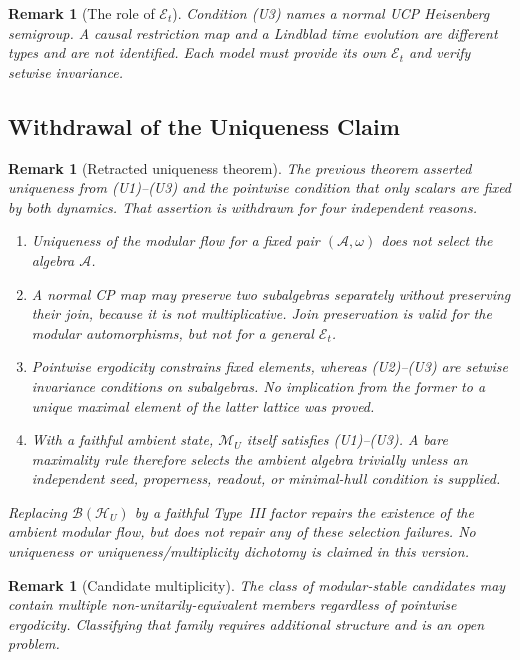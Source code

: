 \documentclass[12pt,a4paper,openany]{book}
\newtheorem{remark}[theorem]{Remark}
\begin{document}
\begin{remark}[The role of $\mathcal{E}_t$]
Condition (U3) names a normal UCP Heisenberg semigroup.  A causal restriction map and a Lindblad time evolution are different types and are not identified.  Each model must provide its own $\mathcal E_t$ and verify setwise invariance.
\end{remark}


\subsection{Withdrawal of the Uniqueness Claim}
\label{H-D-sec:modular-uniqueness}

\begin{remark}[Retracted uniqueness theorem]
\label{H-D-thm:uniqueness}
The previous theorem asserted uniqueness from (U1)--(U3) and the pointwise condition that only scalars are fixed by both dynamics.  That assertion is withdrawn for four independent reasons.
\begin{enumerate}
\item Uniqueness of the modular flow for a \emph{fixed pair} $(\mathcal A,\omega)$ does not select the algebra $\mathcal A$.
\item A normal CP map may preserve two subalgebras separately without preserving their join, because it is not multiplicative.  Join preservation is valid for the modular automorphisms, but not for a general $\mathcal E_t$.
\item Pointwise ergodicity constrains fixed elements, whereas (U2)--(U3) are setwise invariance conditions on subalgebras.  No implication from the former to a unique maximal element of the latter lattice was proved.
\item With a faithful ambient state, $\mathcal M_U$ itself satisfies (U1)--(U3).  A bare maximality rule therefore selects the ambient algebra trivially unless an independent seed, properness, readout, or minimal-hull condition is supplied.
\end{enumerate}
Replacing $\mathcal B(\mathcal H_U)$ by a faithful Type~III factor repairs the existence of the ambient modular flow, but does not repair any of these selection failures.  No uniqueness or uniqueness/multiplicity dichotomy is claimed in this version.
\end{remark}

\begin{remark}[Candidate multiplicity]
\label{H-D-rem:ergodicity}
The class of modular-stable candidates may contain multiple non-unitarily-equivalent members regardless of pointwise ergodicity.  Classifying that family requires additional structure and is an open problem.
\end{remark}
\end{document}
